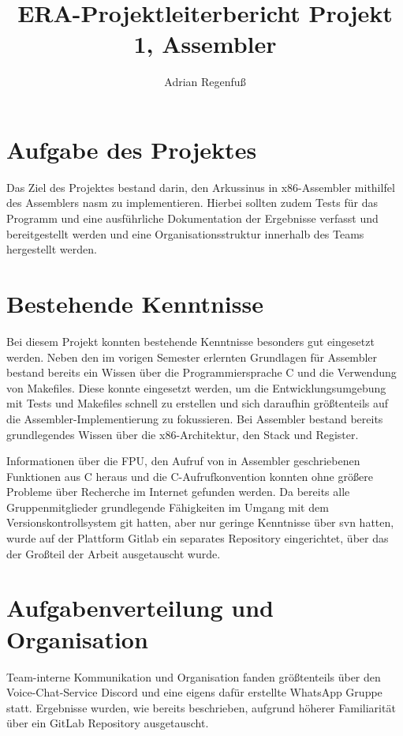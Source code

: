 \documentclass{article}
\title{ERA-Projektleiterbericht Projekt 1, Assembler}
\author{Adrian Regenfuß}
\begin{document}
\maketitle

\section{Aufgabe des Projektes}

Das Ziel des Projektes bestand darin, den Arkussinus in x86-Assembler
mithilfel des Assemblers nasm zu implementieren. Hierbei sollten
zudem Tests für das Programm und eine ausführliche Dokumentation
der Ergebnisse verfasst und bereitgestellt werden und eine Organisationsstruktur
innerhalb des Teams hergestellt werden.

\section{Bestehende Kenntnisse}

Bei diesem Projekt konnten bestehende Kenntnisse besonders gut
eingesetzt werden. Neben den im vorigen Semester erlernten Grundlagen
für Assembler bestand bereits ein Wissen über die Programmiersprache
C und die Verwendung von Makefiles. Diese konnte eingesetzt werden, um
die Entwicklungsumgebung mit Tests und Makefiles schnell zu erstellen
und sich daraufhin größtenteils auf die Assembler-Implementierung zu
fokussieren. Bei Assembler bestand bereits grundlegendes Wissen über die
x86-Architektur, den Stack und Register.

Informationen über die FPU, den Aufruf von in Assembler geschriebenen
Funktionen aus C heraus und die C-Aufrufkonvention konnten ohne
größere Probleme über Recherche im Internet gefunden werden. Da
bereits alle Gruppenmitglieder grundlegende Fähigkeiten im Umgang mit
dem Versionskontrollsystem git hatten, aber nur geringe Kenntnisse über
svn hatten, wurde auf der Plattform Gitlab ein separates Repository
eingerichtet, über das der Großteil der Arbeit ausgetauscht wurde.

\section{Aufgabenverteilung und Organisation}

Team-interne Kommunikation und Organisation fanden größtenteils über
den Voice-Chat-Service Discord und eine eigens dafür erstellte WhatsApp
Gruppe statt. Ergebnisse wurden, wie bereits beschrieben, aufgrund
höherer Familiarität über ein GitLab Repository ausgetauscht.
\end{document}
